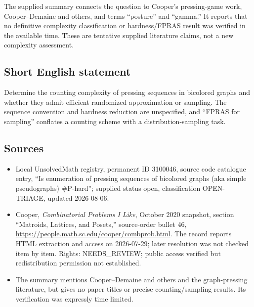\documentclass[11pt]{article}
\begin{document}
The supplied summary connects the question to Cooper's pressing-game work, Cooper--Demaine and others, and terms ``posture'' and ``gamma.'' It reports that no definitive complexity classification or hardness/FPRAS result was verified in the available time. These are tentative supplied literature claims, not a new complexity assessment.
\subsection{Short English statement}
Determine the counting complexity of pressing sequences in bicolored graphs and whether they admit efficient randomized approximation or sampling. The sequence convention and hardness reduction are unspecified, and ``FPRAS for sampling'' conflates a counting scheme with a distribution-sampling task.
\subsection{Sources}
\begin{itemize}
\item Local UnsolvedMath registry, permanent ID 3100046, source code catalogue entry, ``Is enumeration of pressing sequences of bicolored graphs (aka simple pseudographs) \#P-hard''; supplied status open, classification OPEN-TRIAGE, updated 2026-08-06.
\item Cooper, \emph{Combinatorial Problems I Like}, October 2020 snapshot, section ``Matroids, Lattices, and Posets,'' source-order bullet 46, \url{https://people.math.sc.edu/cooper/combprob.html}. The record reports HTML extraction and access on 2026-07-29; later resolution was not checked item by item. Rights: NEEDS\_REVIEW; public access verified but redistribution permission not established.
\item The summary mentions Cooper--Demaine and others and the graph-pressing literature, but gives no paper titles or precise counting/sampling results. Its verification was expressly time limited.
\end{itemize}
\end{document}
